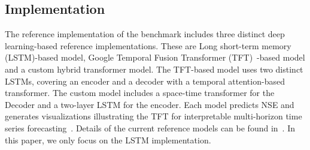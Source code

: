 \subsection{Implementation}

The reference implementation of the benchmark includes three
distinct deep learning-based reference implementations. These are Long
short-term memory (LSTM)-based model, Google Temporal Fusion
Transformer (TFT)~\cite{TFT-21}-based model and a custom hybrid
transformer model. The TFT-based model uses two distinct LSTMs,
covering an encoder and a decoder with a temporal attention-based
transformer. The custom model includes a space-time transformer for
the Decoder and a two-layer LSTM for the encoder. Each model predicts
NSE and generates visualizations illustrating the TFT for
interpretable multi-horizon time series
forecasting~\cite{TFT-21}. Details of the current reference models can
be found in~\cite{fox2022-jm}.  In this paper, we only focus on the
LSTM implementation.

